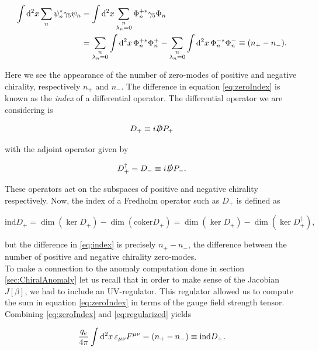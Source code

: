 \begin{align}
    \int \dd[2]{x} \sum_n \psi_n^* \gamma_5 \psi_n &= \int\dd[2]{x} \sum_{\substack{n \\ \lambda_n=0}}\Phi_n^{+*}\gamma_5 \Phi_n \nonumber\\
    &=  \sum_{\substack{n \\ \lambda_n=0}} \int\dd[2]{x}\Phi_n^{+*} \Phi_n^+ - \sum_{\substack{n \\ \lambda_n=0}}\int\dd[2]{x}\Phi_n^{-*} \Phi_n^- \equiv (n_+ - n_-).
    \label{eq:zeroIndex}
\end{align}

Here we see the appearance of the number of zero-modes of positive and negative chirality, respectively $n_+$ and $n_-$. The difference in equation \eqref{eq:zeroIndex} is known as the \emph{index} of a differential operator. The differential operator we are considering is

\begin{equation}
    D_+ \equiv  i\slashed{D}P_+
\end{equation}

with the adjoint operator given by

\begin{equation}
     D_+^\dagger = D_- \equiv  i\slashed{D}P_-.
\end{equation}

These operators act on the subspaces of positive and negative chirality respectively. Now, the index of a Fredholm operator such as $D_+$ is defined as

\begin{equation}
\text{ind}D_+= \dim(\ker D_+) - \dim(\text{coker}D_+) = \dim(\ker D_+) - \dim(\ker D_+^\dagger),
\label{eq:index}
\end{equation}

but the difference in \eqref{eq:index} is precisely $n_+ - n_-$, the difference between the number of positive and negative chirality zero-modes.\\

To make a connection to the anomaly computation done in section \ref{sec:ChiralAnomaly} let us recall that in order to make sense of the Jacobian $J[\beta]$, we had to include an UV-regulator. This regulator allowed us to compute the sum in equation \eqref{eq:zeroIndex} in terms of the gauge field strength tensor. Combining \eqref{eq:zeroIndex} and \eqref{eq:regularized} yields

\begin{equation}
\frac{q_e}{4\pi}\int\dd[2]{x}\varepsilon_{\mu\nu} F^{\mu\nu} = (n_+ - n_-)\equiv \text{ind} D_+.
\end{equation}

